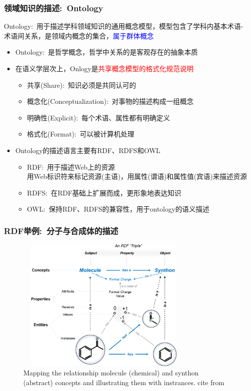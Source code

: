 \frame
{
	\frametitle{领域知识的描述:~\textrm{Ontology}}
	\textrm{Ontology}:~用于描述学科领域知识的通用概念模型，模型包含了学科内基本术语-术语间关系，是领域内概念的集合，\textcolor{blue}{属于群体概念}
	\begin{itemize}
		\item \textrm{Ontology}:~是哲学概念，哲学中关系的是客观存在的抽象本质
		\item 在语义学层次上，\textrm{Onlogy}是\textcolor{red}{共享概念模型的格式化规范说明}
	\begin{itemize}
		\item 共享\textrm{(Share)}:~知识必须是共同认可的
		\item 概念化\textrm{(Conceptualization)}:~对事物的描述构成一组概念
		\item 明确性\textrm{(Explicit)}:~每个术语、属性都有明确定义
		\item 格式化\textrm{(Format)}:~可以被计算机处理
	\end{itemize}
\item \textrm{Ontology}的描述语言主要有\textrm{RDF}、\textrm{RDFS}和\textrm{OWL}
	\begin{itemize}
		\item \textrm{RDF}:~用于描述\textrm{Web}上的资源\\
			用\textrm{Web}标识符来标记资源(主语)，用属性(谓语)和属性值(宾语)来描述资源
		\item \textrm{RDFS}:~在\textrm{RDF}基础上扩展而成，更形象地表达知识
		\item \textrm{OWL}:~保持\textrm{RDF}、\textrm{RDFS}的兼容性，用于\textrm{ontology}的语义描述
	\end{itemize}
	\end{itemize}
}

\frame
{
	\frametitle{\textrm{RDF}举例:~分子与合成体的描述}
\begin{figure}[h!]
\centering
\vskip -8pt
\includegraphics[height=2.60in,width=3.45in,viewport=0 0 950 790,clip]{Figures/Mapping-the-relationship-between-molecule-and-synthon.png}
\caption{\tiny\textrm{Mapping the relationship molecule (chemical) and synthon (abstract) concepts and illustrating them with instrances. cite from\cite{ACR56-128_2023}}}%
\label{Fig:Mapping-relationship-molecule-synthon}
\end{figure}
}

